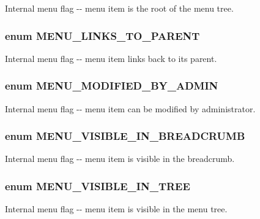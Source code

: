 \label{group__menu__flags_ga24354914e560f062f1999c2caddcb557}
Internal menu flag -\/-\/ menu item is the root of the menu tree. \hypertarget{group__menu__flags_ga5ec2b7780807d41d9e691981976d51b1}{
\subsubsection[{MENU\_\-LINKS\_\-TO\_\-PARENT}]{\setlength{\rightskip}{0pt plus 5cm}enum {\bf MENU\_\-LINKS\_\-TO\_\-PARENT}}}
\label{group__menu__flags_ga5ec2b7780807d41d9e691981976d51b1}
Internal menu flag -\/-\/ menu item links back to its parent. \hypertarget{group__menu__flags_ga784c1ff27202a1d2edafca310e15a0a1}{
\subsubsection[{MENU\_\-MODIFIED\_\-BY\_\-ADMIN}]{\setlength{\rightskip}{0pt plus 5cm}enum {\bf MENU\_\-MODIFIED\_\-BY\_\-ADMIN}}}
\label{group__menu__flags_ga784c1ff27202a1d2edafca310e15a0a1}
Internal menu flag -\/-\/ menu item can be modified by administrator. \hypertarget{group__menu__flags_ga401fd8a91b185414422e9258c44235c0}{
\subsubsection[{MENU\_\-VISIBLE\_\-IN\_\-BREADCRUMB}]{\setlength{\rightskip}{0pt plus 5cm}enum {\bf MENU\_\-VISIBLE\_\-IN\_\-BREADCRUMB}}}
\label{group__menu__flags_ga401fd8a91b185414422e9258c44235c0}
Internal menu flag -\/-\/ menu item is visible in the breadcrumb. \hypertarget{group__menu__flags_gac55f524092d03020a397d5622251de11}{
\subsubsection[{MENU\_\-VISIBLE\_\-IN\_\-TREE}]{\setlength{\rightskip}{0pt plus 5cm}enum {\bf MENU\_\-VISIBLE\_\-IN\_\-TREE}}}
\label{group__menu__flags_gac55f524092d03020a397d5622251de11}
Internal menu flag -\/-\/ menu item is visible in the menu tree. 